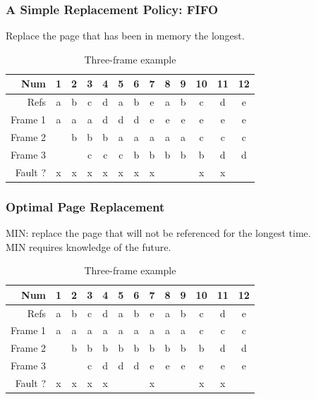 \documentclass[12pt]{article}
\theoremstyle{plain}
\theoremstyle{definition}
\begin{document}
\subsubsection{A Simple Replacement Policy: FIFO}
Replace the page that has been in memory the longest.
\begin{table}[H]
  \vspace{-20pt}
  \caption{Three-frame example}
  \centering
  \begin{tabular}{|r|c|c|c|c|c|c|c|c|c|c|c|c|}
  \hline
  Num & 1 & 2 & 3 & 4 & 5 & 6 & 7 & 8 & 9 & 10 & 11 & 12 \\ \hline
  Refs & a & b & c & d & a & b & e & a & b & c & d & e \\ \hline
  \hline
  Frame 1 & a & a & a & d & d & d & e & e & e & e & e & e \\ \hline
  Frame 2 &  & b & b & b & a & a & a & a & a & c & c & c \\ \hline
  Frame 3 &  &  & c & c & c & b & b & b & b & b & d & d \\ \hline
  Fault ? & x & x & x & x & x & x & x &  &  & x & x &  \\ \hline
  \end{tabular}
\end{table}

\subsubsection{Optimal Page Replacement}
MIN: replace the page that will not be referenced for the longest time. \\
MIN requires knowledge of the future.

\begin{table}[H]
  \vspace{-20pt}
  \caption{Three-frame example}
  \centering
  \begin{tabular}{|r|c|c|c|c|c|c|c|c|c|c|c|c|}
  \hline
  Num & 1 & 2 & 3 & 4 & 5 & 6 & 7 & 8 & 9 & 10 & 11 & 12 \\ \hline
  Refs & a & b & c & d & a & b & e & a & b & c & d & e \\ \hline
  \hline
  Frame 1 & a & a & a & a & a & a & a & a & a & c & c & c \\ \hline
  Frame 2 &  & b & b & b & b & b & b & b & b & b & d & d \\ \hline
  Frame 3 &  &  & c & d & d & d & e & e & e & e & e & e \\ \hline
  Fault ? & x & x & x & x &  &  & x &  &  & x & x &  \\ \hline
  \end{tabular}
\end{table}
\end{document}
